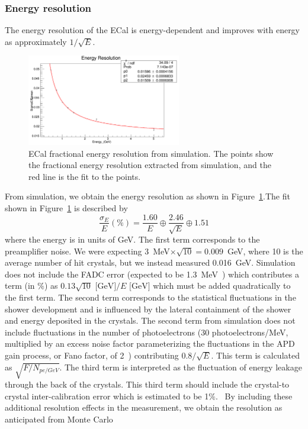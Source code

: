 \subsubsection{Energy resolution}

The energy resolution of the ECal is energy-dependent and improves with energy as approximately $1/\sqrt{E}$. 
\begin{figure}[htb]
  \centering
      \includegraphics[width=0.6\textwidth]{pics/performance/eResFitMC.png}
  \caption[ECal fractional energy resolution fitted from simulation]{ECal fractional energy resolution from simulation. The points show the fractional energy resolution extracted from simulation, and the red line is the fit to the points.}
  \label{Figure:eResFitMC}
\end{figure}
From simulation, we obtain the energy resolution as shown in Figure~\ref{Figure:eResFitMC}.The fit shown in Figure~\ref{Figure:eResFitMC} is described by
\begin{equation}
\label{eq:eResMC}
\dfrac{\sigma_E}{E} (\%) = \dfrac{1.60}{E} \oplus \dfrac{2.46}{\sqrt{E}} \oplus 1.51
\end{equation}
where the energy is in units of GeV. The first term corresponds to the preamplifier noise. We were expecting 3~MeV$\times \sqrt{10} = 0.009$~GeV, where 10 is the average number of hit crystals, but we instead measured 0.016~GeV. Simulation does not include the FADC error (expected to be 1.3~MeV~\cite{charles_2014}) which contributes a term (in $\%$) as $0.13\sqrt{10}\textrm{ [GeV]}/E\textrm{ [GeV]}$ which must be added quadratically to the first term. The second term corresponds to the statistical fluctuations in the shower development and is influenced by the lateral containment of the shower and energy deposited in the crystals. The second term from simulation does not include fluctuations in the number of photoelectrons (30 photoelectrons/MeV, multiplied by an excess noise factor parameterizing the fluctuations in the APD gain process, or Fano factor, of 2~\cite{panda_2008}) contributing $0.8/\sqrt{E}$. This term is calculated as $\sqrt{F/N_{pe/GeV}}$. The third term is interpreted as the fluctuation of energy leakage through the back of the crystals. This third term should include the crystal-to crystal inter-calibration error which is estimated to be 1$\%$.~\cite{szumila-vance_hps_ecal_2014} By including these additional resolution effects in the measurement, we obtain the resolution as anticipated from Monte Carlo

